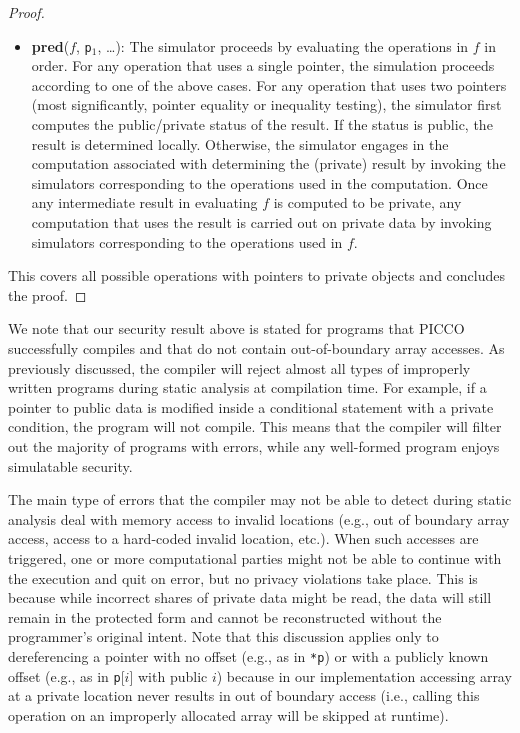 \documentclass[11pt]{article}
\begin{document}
\begin{proof}
\begin{itemize}
  \item \textbf{pred}($f$, \texttt{p}$_1$, {\ldots}): The simulator proceeds
    by evaluating the operations in $f$ in order. For any operation that
    uses a single pointer, the simulation proceeds according to one of the
    above cases. For any operation that uses two pointers (most
    significantly, pointer equality or inequality testing), the simulator
    first computes the public/private status of the result. If the status is
    public, the result is determined locally. Otherwise, the simulator
    engages in the computation associated with determining the (private)
    result by invoking the simulators corresponding to the operations used
    in the computation. Once any intermediate result in evaluating $f$ is
    computed to be private, any computation that uses the result is carried
    out on private data by invoking simulators corresponding to the
    operations used in $f$.
\end{itemize}
This covers all possible operations with pointers to private objects and
concludes the proof. 
\end{proof}

We note that our security result above is stated for programs that PICCO
successfully compiles and that do not contain out-of-boundary array accesses.
As previously discussed, the compiler will reject almost all 
types of improperly written programs during static analysis at
compilation time. For example, if a pointer to public data is modified
inside a conditional statement with a private condition, the program
will not compile. This means that the compiler will filter out the
majority of programs with errors, while any well-formed program enjoys
simulatable security.

The main type of errors that the compiler may not be able to detect during
static analysis deal with memory access to invalid locations (e.g., out of
boundary array access, access to a hard-coded invalid location, etc.). When
such accesses are triggered, one or more computational parties might not be
able to continue with the execution and quit on error, but no privacy
violations take place. This is because while incorrect shares of private
data might be read, the data will still remain in the protected form and
cannot be reconstructed without the programmer's original intent. Note that
this discussion applies only to dereferencing a pointer with no offset
(e.g., as in \texttt{*p}) or with a publicly known offset (e.g., as in
\texttt{p}[$i$] with public $i$) because in our implementation accessing
array at a private location never results in out of boundary access (i.e.,
calling this operation on an improperly allocated array will be skipped at
 runtime).
\end{document}
